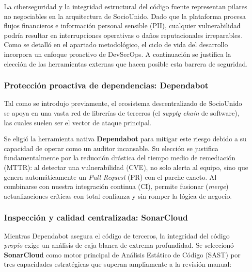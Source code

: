 La ciberseguridad y la integridad estructural del código fuente representan pilares no negociables en la arquitectura de SocioUnido. Dado que la plataforma procesa flujos financieros e información personal sensible (PII), cualquier vulnerabilidad podría resultar en interrupciones operativas o daños reputacionales irreparables. Como se detalló en el apartado metodológico, el ciclo de vida del desarrollo incorpora un enfoque proactivo de DevSecOps. A continuación se justifica la elección de las herramientas externas que hacen posible esta barrera de seguridad.

\subsubsection{Protección proactiva de dependencias: Dependabot}

Tal como se introdujo previamente, el ecosistema descentralizado de SocioUnido se apoya en una vasta red de librerías de terceros (el \textit{supply chain} de software), las cuales suelen ser el vector de ataque principal. 

Se eligió la herramienta nativa \textbf{Dependabot} para mitigar este riesgo debido a su capacidad de operar como un auditor incansable. Su elección se justifica fundamentalmente por la reducción drástica del tiempo medio de remediación (MTTR): al detectar una vulnerabilidad (CVE), no solo alerta al equipo, sino que genera automáticamente un \textit{Pull Request} (PR) con el parche exacto. Al combinarse con nuestra integración continua (CI), permite fusionar (\textit{merge}) actualizaciones críticas con total confianza y sin romper la lógica de negocio.

\subsubsection{Inspección y calidad centralizada: SonarCloud}

Mientras Dependabot asegura el código de terceros, la integridad del código \textit{propio} exige un análisis de caja blanca de extrema profundidad. Se seleccionó \textbf{SonarCloud} como motor principal de Análisis Estático de Código (SAST) por tres capacidades estratégicas que superan ampliamente a la revisión manual:

